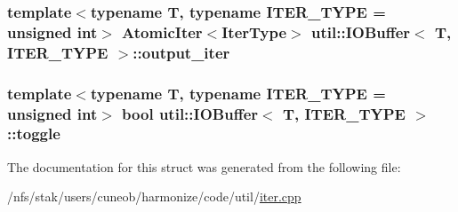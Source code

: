 \hypertarget{structutil_1_1IOBuffer_a105bc379d118e236e6864c56c9161cbb}{
\subsubsection[{output\-\_\-iter}]{\setlength{\rightskip}{0pt plus 5cm}template$<$typename T, typename I\-T\-E\-R\-\_\-\-T\-Y\-P\-E = unsigned int$>$ {\bf Atomic\-Iter}$<${\bf Iter\-Type}$>$ {\bf util\-::\-I\-O\-Buffer}$<$ T, I\-T\-E\-R\-\_\-\-T\-Y\-P\-E $>$\-::output\-\_\-iter}}\label{structutil_1_1IOBuffer_a105bc379d118e236e6864c56c9161cbb}
\hypertarget{structutil_1_1IOBuffer_af5d39f08d97c8069a889e5818805979c}{
\subsubsection[{toggle}]{\setlength{\rightskip}{0pt plus 5cm}template$<$typename T, typename I\-T\-E\-R\-\_\-\-T\-Y\-P\-E = unsigned int$>$ bool {\bf util\-::\-I\-O\-Buffer}$<$ T, I\-T\-E\-R\-\_\-\-T\-Y\-P\-E $>$\-::toggle}}\label{structutil_1_1IOBuffer_af5d39f08d97c8069a889e5818805979c}


The documentation for this struct was generated from the following file\-:\begin{DoxyCompactItemize}
\item 
/nfs/stak/users/cuneob/harmonize/code/util/\hyperlink{iter_8cpp}{iter.\-cpp}\end{DoxyCompactItemize}

